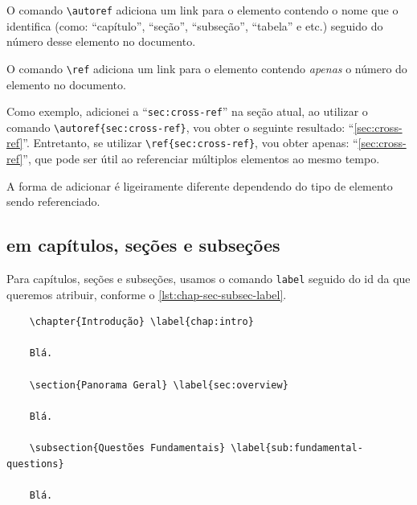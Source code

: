 O comando \texttt{\textbackslash{}autoref} adiciona um link para o elemento contendo o nome que o identifica (como: \enquote{capítulo}, \enquote{seção}, \enquote{subseção}, \enquote{tabela} e etc.) seguido do número desse elemento no documento.

O comando \texttt{\textbackslash{}ref} adiciona um link para o elemento contendo \emph{apenas} o número do elemento no documento.

Como exemplo, adicionei a  \enquote{\texttt{sec:cross-ref}} na seção atual, ao utilizar o comando \texttt{\textbackslash{}autoref\{sec:cross-ref\}}, vou obter o seguinte resultado: \enquote{\autoref{sec:cross-ref}}.
Entretanto, se utilizar \texttt{\textbackslash{}ref\{sec:cross-ref\}}, vou obter apenas: \enquote{\ref{sec:cross-ref}}, que pode ser útil ao referenciar múltiplos elementos ao mesmo tempo.

A forma de adicionar  é ligeiramente diferente dependendo do tipo de elemento sendo referenciado.

\subsection{\texorpdfstring{}{Labels} em capítulos, seções e subseções}

Para capítulos, seções e subseções, usamos o comando \texttt{label} seguido do id da  que queremos atribuir, conforme o \autoref{lst:chap-sec-subsec-label}.

\begin{listing}[htb]
  \begin{verbatim}
    \chapter{Introdução} \label{chap:intro}

    Blá.

    \section{Panorama Geral} \label{sec:overview}

    Blá.

    \subsection{Questões Fundamentais} \label{sub:fundamental-questions}

    Blá.
  \end{verbatim}
  \caption{Atribuição de  em capítulos, seções e subseções}
  \label{lst:chap-sec-subsec-label}
\end{listing}

